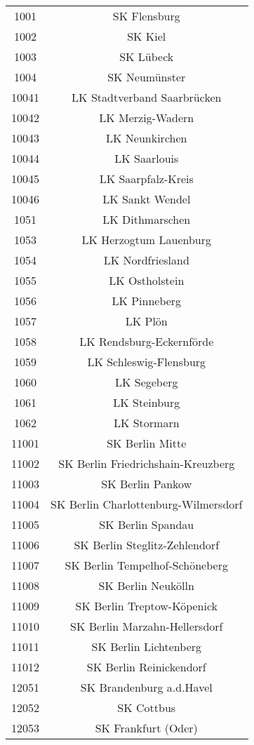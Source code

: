 \begin{tabular}{c c}
    1001&SK Flensburg\\ 
    1002&SK Kiel\\ 
    1003&SK Lübeck\\ 
    1004&SK Neumünster\\ 
    10041&LK Stadtverband Saarbrücken\\ 
    10042&LK Merzig-Wadern\\ 
    10043&LK Neunkirchen\\ 
    10044&LK Saarlouis\\ 
    10045&LK Saarpfalz-Kreis\\ 
    10046&LK Sankt Wendel\\ 
    1051&LK Dithmarschen\\ 
    1053&LK Herzogtum Lauenburg\\ 
    1054&LK Nordfriesland\\ 
    1055&LK Ostholstein\\ 
    1056&LK Pinneberg\\ 
    1057&LK Plön\\ 
    1058&LK Rendsburg-Eckernförde\\ 
    1059&LK Schleswig-Flensburg\\ 
    1060&LK Segeberg\\ 
    1061&LK Steinburg\\ 
    1062&LK Stormarn\\ 
    11001&SK Berlin Mitte\\ 
    11002&SK Berlin Friedrichshain-Kreuzberg\\ 
    11003&SK Berlin Pankow\\ 
    11004&SK Berlin Charlottenburg-Wilmersdorf\\ 
    11005&SK Berlin Spandau\\ 
    11006&SK Berlin Steglitz-Zehlendorf\\ 
    11007&SK Berlin Tempelhof-Schöneberg\\ 
    11008&SK Berlin Neukölln\\ 
    11009&SK Berlin Treptow-Köpenick\\ 
    11010&SK Berlin Marzahn-Hellersdorf\\ 
    11011&SK Berlin Lichtenberg\\ 
    11012&SK Berlin Reinickendorf\\ 
    12051&SK Brandenburg a.d.Havel\\ 
    12052&SK Cottbus\\ 
    12053&SK Frankfurt (Oder)\\ 

\end{tabular}
